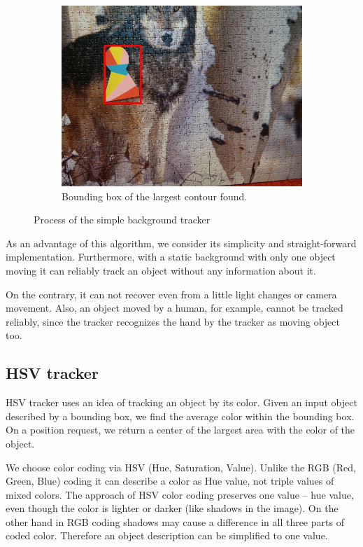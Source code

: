 \begin{figure}
\begin{subfigure}[b]{0.48\linewidth}
    \includegraphics[width=\linewidth]{img/simple_background/result.jpg}
    \caption{Bounding box of the largest contour found.}
  \end{subfigure}
  \caption{Process of the simple background tracker}
  \label{fig:simple-background-tracker}
\end{figure}

As an advantage of this algorithm, we consider its simplicity and
straight-forward implementation. Furthermore, with a static background with
only one object moving it can reliably track an object without any information
about it.

On the contrary, it can not recover even from a little light changes or camera
movement. Also, an object moved by a human, for example, cannot be tracked
reliably, since the tracker recognizes the hand by the tracker as moving object
too.

\subsection{HSV tracker}

HSV tracker uses an idea of tracking an object by its color. Given an input
object described by a bounding box, we find the average color within the
bounding box. On a position request, we return a center of the largest area
with the color of the object.

We choose color coding via HSV (Hue, Saturation, Value). Unlike the RGB (Red,
Green, Blue) coding it can describe a color as Hue value, not triple values of
mixed colors. The approach of HSV color coding preserves one value -- hue
value,  even though the color is lighter or darker (like shadows in the image).
On the other hand in RGB coding shadows may cause a difference in all three
parts of coded color. Therefore an object description can be simplified
to one value.

